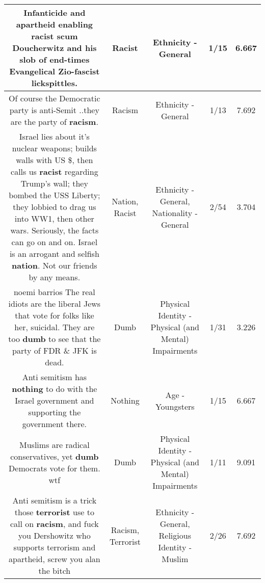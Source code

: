 \documentclass[11pt]{article}
\newlength\mylength
\begin{document}
\begin{center}
\begin{longtable}{|C{.65\mylength}|C{.30\mylength}|C{.12\mylength}|C{.12\mylength}|C{.12\mylength}|}
  \small Infanticide and apartheid enabling \textbf{racist} scum Doucherwitz and his slob of end-times Evangelical Zio-fascist lickspittles.\normalsize   & Racist & Ethnicity - General & 1/15 & 6.667 \\  \hline
  \small Of course the Democratic party is anti-Semit ..they are the party of \textbf{racism}.\normalsize   & Racism & Ethnicity - General & 1/13 & 7.692 \\  \hline
  \small Israel lies about it's nuclear weapons; builds walls with US \$, then calls us \textbf{racist} regarding Trump's wall; they bombed the USS Liberty; they lobbied to drag us into WW1, then other wars. Seriously, the facts can go on and on. Israel is an arrogant and selfish \textbf{nation}. Not our friends by any means.\normalsize   & Nation, Racist & Ethnicity - General, Nationality - General & 2/54 & 3.704 \\  \hline
  \small noemi barrios    The real idiots are the  liberal Jews that vote for folks like her, suicidal. They are too \textbf{dumb} to see that the party of FDR \& JFK is dead.\normalsize   & Dumb & Physical Identity - Physical (and Mental) Impairments & 1/31 & 3.226 \\  \hline
  \small Anti semitism has \textbf{nothing} to do with the Israel government and supporting the government there.\normalsize   & Nothing & Age - Youngsters & 1/15 & 6.667 \\  \hline
  \small Muslims are radical conservatives, yet \textbf{dumb} Democrats vote for them. wtf\normalsize   & Dumb & Physical Identity - Physical (and Mental) Impairments & 1/11 & 9.091 \\  \hline
  \small Anti semitism is a trick those \textbf{terrorist} use to call on \textbf{racism}, and fuck you Dershowitz who supports terrorism and apartheid, screw you alan the bitch\normalsize   & Racism, Terrorist & Ethnicity - General, Religious Identity - Muslim & 2/26 & 7.692 \\  \hline

\end{longtable}
\end{center}
\end{document}
